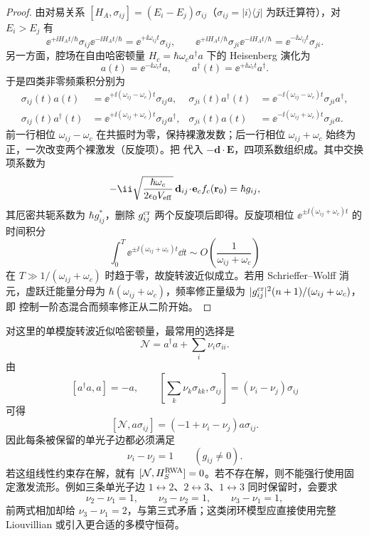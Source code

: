 \begin{proof}
由对易关系 $[H_A,\sigma_{ij}]=(E_i-E_j)\sigma_{ij}$（\(\sigma_{ij}=|i\rangle\langle j|\) 为跃迁算符），对 $E_i>E_j$ 有
\[
\ee^{+\ii H_At/\hbar}\sigma_{ij}\ee^{-\ii H_At/\hbar}
=\ee^{+\ii\omega_{ij}t}\sigma_{ij},
\qquad
\ee^{+\ii H_At/\hbar}\sigma_{ji}\ee^{-\ii H_At/\hbar}
=\ee^{-\ii\omega_{ij}t}\sigma_{ji}.
\]
另一方面，腔场在自由哈密顿量 \(H_c=\hbar\omega_c a^\dagger a\) 下的 Heisenberg 演化为
\[
a(t)=\ee^{-\ii\omega_ct}a,
\qquad
a^\dagger(t)=\ee^{+\ii\omega_ct}a^\dagger.
\]
于是四类非零频乘积分别为
\begin{align*}
\sigma_{ij}(t)a(t)
&=\ee^{+\ii(\omega_{ij}-\omega_c)t}\sigma_{ij}a,
&
\sigma_{ji}(t)a^\dagger(t)
&=\ee^{-\ii(\omega_{ij}-\omega_c)t}\sigma_{ji}a^\dagger,\\
\sigma_{ij}(t)a^\dagger(t)
&=\ee^{+\ii(\omega_{ij}+\omega_c)t}\sigma_{ij}a^\dagger,
&
\sigma_{ji}(t)a(t)
&=\ee^{-\ii(\omega_{ij}+\omega_c)t}\sigma_{ji}a.
\end{align*}
前一行相位 \(\omega_{ij}-\omega_c\) 在共振时为零，保持裸激发数；后一行相位 \(\omega_{ij}+\omega_c\) 始终为正，一次改变两个裸激发（反旋项）。把 代入 $-\mathbf d\cdot\mathbf E$，四项系数组织成。其中交换项系数为
\[
-\ii\sqrt{\frac{\hbar\omega_c}{2\epsilon_0V_{\rm eff}}}
\,\mathbf d_{ij}\!\cdot\!\mathbf e_c f_c(\mathbf r_0)
=\hbar g_{ij},
\]
其厄密共轭系数为 $\hbar g_{ij}^*$，删除 $g_{ij}^{\rm cr}$ 两个反旋项后即得。反旋项相位 \(\ee^{\pm\ii(\omega_{ij}+\omega_c)t}\) 的时间积分
\[
 \int_0^T\ee^{\pm\ii(\omega_{ij}+\omega_c)t}\dd t
 \sim O\!\left(\frac{1}{\omega_{ij}+\omega_c}\right)
\]
在 \(T\gg1/(\omega_{ij}+\omega_c)\) 时趋于零，故旋转波近似成立。若用 Schrieffer--Wolff 消元，虚跃迁能量分母为 $\hbar(\omega_{ij}+\omega_c)$，频率修正量级为 $|g_{ij}^{\rm cr}|^2(n+1)/(\omega_{ij}+\omega_c)$，即 控制一阶态混合而频率修正从二阶开始。
\end{proof}

对这里的单模旋转波近似哈密顿量，最常用的选择是
\begin{equation}
\mathcal N=a^\dagger a+\sum_i\nu_i\sigma_{ii}.
\label{eq:phys-oqs-excitation-number-general}
\end{equation}
由
\[
[a^\dagger a,a]=-a,
\qquad
\left[\sum_k\nu_k\sigma_{kk},\sigma_{ij}\right]
=(\nu_i-\nu_j)\sigma_{ij}
\]
可得
\[
[\mathcal N,a\sigma_{ij}]
=(-1+\nu_i-\nu_j)a\sigma_{ij}.
\]
因此每条被保留的单光子边都必须满足
\begin{equation}
\nu_i-\nu_j=1\qquad(g_{ij}\ne0).
\label{eq:phys-oqs-grading-edge-condition}
\end{equation}
若这组线性约束存在解，就有 $[\mathcal N,H_S^{\rm RWA}]=0$。若不存在解，则不能强行使用固定激发流形。例如三条单光子边 $1\leftrightarrow2$、$2\leftrightarrow3$、$1\leftrightarrow3$ 同时保留时，会要求
\[
\nu_2-\nu_1=1,
\qquad
\nu_3-\nu_2=1,
\qquad
\nu_3-\nu_1=1,
\]
前两式相加却给 $\nu_3-\nu_1=2$，与第三式矛盾；这类闭环模型应直接使用完整 Liouvillian 或引入更合适的多模守恒荷。

